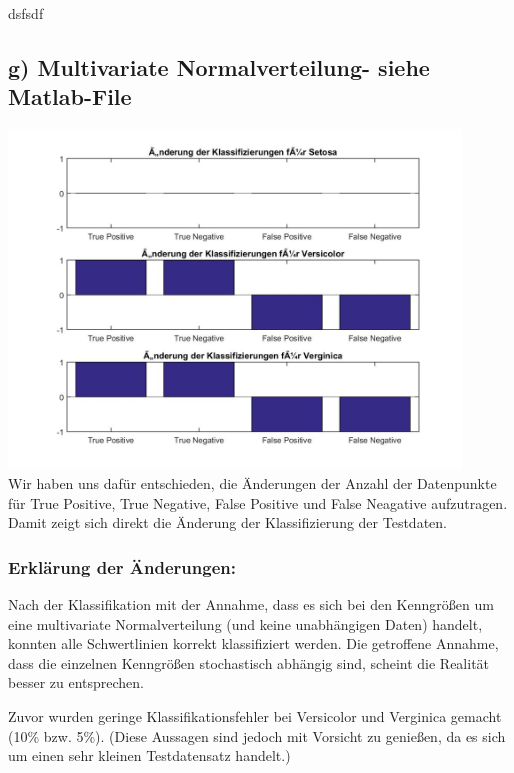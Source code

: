 \documentclass{scrartcl}
\begin{document}
dsfsdf

\subsection*{g) Multivariate Normalverteilung- siehe Matlab-File}

\includegraphics[width=0.9\textwidth]{plots/diffsAll.jpg} \\

Wir haben uns dafür entschieden, die Änderungen der Anzahl der Datenpunkte für True Positive, True Negative, False Positive und False Neagative aufzutragen.\\
Damit zeigt sich direkt die Änderung der Klassifizierung der Testdaten.

\subsubsection*{Erklärung der Änderungen:}

Nach der Klassifikation mit der Annahme, dass es sich bei den Kenngrößen um eine multivariate Normalverteilung (und keine unabhängigen Daten) handelt, konnten alle Schwertlinien korrekt klassifiziert werden.
Die getroffene Annahme, dass die einzelnen Kenngrößen stochastisch abhängig sind, scheint die Realität besser zu entsprechen.

Zuvor wurden geringe Klassifikationsfehler  bei Versicolor und Verginica gemacht (10\% bzw. 5\%). (Diese Aussagen sind jedoch mit Vorsicht zu genießen, da es sich um einen sehr kleinen Testdatensatz handelt.)
\end{document}
